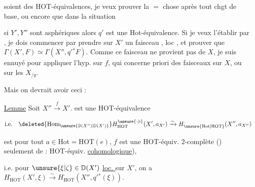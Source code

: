 

\margin{$\unsure{\ast|\times}$}

soient des HOT-équivalences, je veux prouver la $=$ chose après tout chgt de base, ou encore que dans la situation


si $Y',Y''$ sont asphériques alors $q'$ est une Hot-équivalence. Si je veux l'établir par  , je dois commencer par prendre sur $X'$ un faisceau \uline{}, loc  , et prouver que $\Gamma(X',F)\simeq\Gamma(X'',q'{}^*F)$. Comme ce faisceau ne provient pas de $X$, je suis ennuyé pour appliquer l'hyp. sur $f$, qui concerne  priori des faisceaux  sur $X$, ou sur les $X_{/y}$.

Mais on devrait avoir ceci :


\uline{Lemme} Soit $X''\overset{f}{\longrightarrow}X'$.  est une HOT-équivalence

\[
\text{i.e.}\quad \deleted{\mathrm{Hom}_{\unsure{\mathbb D(X'')|\mathbb D(X')}}}
H^{\unsure{\cdot|i}}_{\mathrm{HOT}}(X',a_{X'})\xrightarrow{\sim}
H^{\cdot}_{\unsure{\mathrm{Hot}|\mathrm{HOT}}}(X'',a_{X''})
\]

est  pour tout $a\in\mathrm{Hot}=\mathrm{HOT}(e)$,  $f$ est \deleted{\unsure{$=$}}  une HOT-équiv. $2$-complète ()  seulement de : HOT-équiv. \uline{cohomologique}),


i.e. pour   $\unsure{\xi|\zeta}\in\mathbb D(X')$ \uline{loc. } sur $X'$, on a $H^{\cdot}_{\mathrm{HOT}}(X',\xi)\xrightarrow{\sim}H^{\cdot}_{\mathrm{HOT}}(X'',q'{}^*(\xi))$\unsure{$($|/}.

